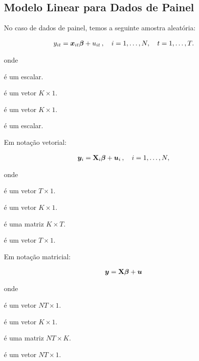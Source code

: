 \documentclass[11pt, oneside, a4paper, article]{article}
\numberwithin{equation}{section}
\begin{document}
\subsection{Modelo Linear para Dados de Painel}

No caso de dados de painel, temos a seguinte amostra aleatória:

\vspace{-1 em}
\begin{align}\label{pols:mod}
y_{it} &= \boldsymbol{x}_{it} \boldsymbol{\beta} + u_{it} \, , \quad i=1, \dots, N, \quad t=1, \dots, T.
\end{align}

\noindent onde
\vspace{-1 em}
\begin{description}[noitemsep]
	\item[$y_{it}$] é um escalar.
	\item[$\betavec$] é um vetor $K \times 1$.
	\item[$\xvec_{it}$] é um vetor $K \times 1$.
	\item[$u_{it}$] é um escalar.
\end{description}

Em notação vetorial:

\vspace{-1 em}
\begin{align*}
\boldsymbol{y}_{i} &= \mathbf{X}_{i} \boldsymbol{\beta} + \boldsymbol{u}_{i} \, , \quad i=1, \dots, N,
\end{align*}

\noindent onde
\vspace{-1 em}
\begin{description}[noitemsep]
	\item[$\yvec_{i}$] é um vetor $T \times 1$.
	\item[$\betavec$] é um vetor $K \times 1$.
	\item[$\Xmat_{i}$] é uma matriz $K \times T$.
	\item[$\uvec_{it}$] é um vetor $T \times 1$.
\end{description}

Em notação matricial:

\vspace{-1 em}
\begin{align*}
\boldsymbol{y} &= \mathbf{X} \boldsymbol{\beta} + \boldsymbol{u}
\end{align*}

\noindent onde
\vspace{-1 em}
\begin{description}[noitemsep]
	\item[$\yvec$] é um vetor $NT \times 1$.
	\item[$\betavec$] é um vetor $K \times 1$.
	\item[$\Xmat$] é uma matriz $NT \times K$.
	\item[$\uvec$] é um vetor $NT \times 1$.
\end{description}
\end{document}
